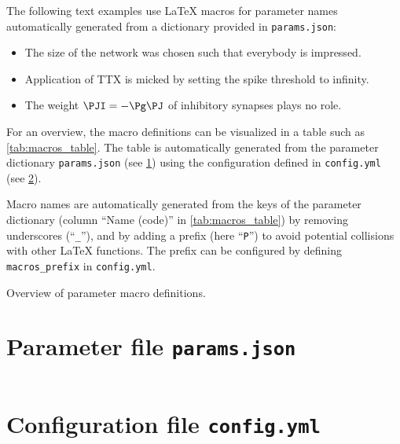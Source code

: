 \documentclass[10pt,a4paper,american]{article}
\begin{document}
The following text examples use LaTeX macros for parameter names automatically generated from a dictionary provided in \texttt{params.json}:
\begin{itemize}
\item The size \PN of the network was chosen such that everybody is impressed.
\item Application of TTX is micked by setting the spike threshold \PVth to infinity.
\item The weight $\PJI=-\Pg\PJ$ of inhibitory synapses plays no role.
\end{itemize}
For an overview, the macro definitions can be visualized in a table such as \cref{tab:macros_table}.
The table is automatically generated from the parameter dictionary \texttt{params.json} (see \cref{app:parameter_file}) using the configuration defined in \texttt{config.yml} (see \cref{app:config_file}).
\par
Macro names are automatically generated from the keys of the parameter dictionary (column ``Name (code)'' in \cref{tab:macros_table}) by removing underscores (``\verb+_+''), and by adding a prefix (here ``\verb+P+'') to avoid potential collisions with other LaTeX functions. The prefix can be configured by defining \verb+macros_prefix+ in \texttt{config.yml}.
\begin{table}[ht!]
\begin{center}
  \parbox{0.8\linewidth}{       %
    \small%
    \centering%
    \renewcommand{\arraystretch}{1.5}%
    \noindent%
    \caption{Overview of parameter macro definitions.}
    \label{tab:macros_table}
  }
\end{center}
\end{table}

\clearpage

\begin{appendix}
  
  \section{Parameter file \texttt{params.json}}
  \label{app:parameter_file}
  \scriptsize
  \inputminted{json}{params.json}  

  \clearpage
  
  \section{Configuration file \texttt{config.yml}}
  \label{app:config_file}
  \small
  \inputminted{yaml}{config.yml}  

\end{appendix}

\end{document}
